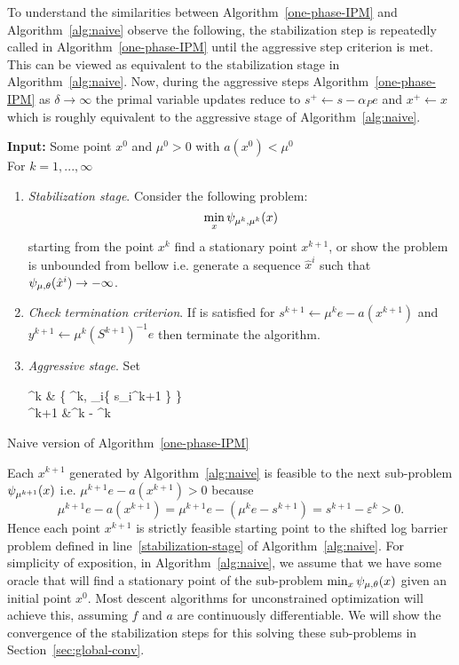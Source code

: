 \documentclass{article}
\begin{document}
To understand the similarities between Algorithm~\ref{one-phase-IPM} and Algorithm~\ref{alg:naive} observe the following, the stabilization step is repeatedly called in Algorithm~\ref{one-phase-IPM} until the aggressive step criterion is met. This can be viewed as equivalent to the stabilization stage in Algorithm~\ref{alg:naive}. Now, during the aggressive steps Algorithm~\ref{one-phase-IPM} as $\delta \rightarrow \infty$ the primal variable updates reduce to $s^{+} \gets s - \alpha_{P} e$ and $x^{+} \gets x$ which is roughly equivalent to the aggressive stage of Algorithm~\ref{alg:naive}. 

\begin{algorithm}[H]
\textbf{Input:} Some point $x^{0}$ and $\mu^{0} > 0$ with $a(x^{0}) < \mu^{0}$ \\

For $k = 1, ..., \infty$
\begin{enumerate}[label*=A.{\arabic*}]
\item \label{stabilization-stage} \emph{Stabilization stage}. Consider the following problem:
$$
\min_{x} \psi_{\mu^{k},\mu^{k}}(x)
$$
starting from the point $x^{k}$ find a stationary point $x^{k+1}$, or show the problem is unbounded from bellow i.e. generate a sequence $\hat{x}^{i}$ such that $\psi_{\mu,\theta}(\hat{x}^{i}) \rightarrow -\infty$.
\item \emph{Check termination criterion}. If \termination{} is satisfied for $s^{k+1} \gets \mu^{k} e - a(x^{k+1})$ and $y^{k+1} \gets \mu^{k} (S^{k+1})^{-1} e$ then terminate the algorithm.
\item \label{agg-stage} \emph{Aggressive stage}. Set
\begin{flalign}
\varepsilon^k &\gets {} \min\left\{ \mu^{k}, \min_i\{ s_i^{k+1} \} \right\} \\
\mu^{k+1} &\gets \mu^{k} - \varepsilon^k
\end{flalign}
\end{enumerate}
\caption{Naive version of Algorithm~\ref{one-phase-IPM}}\label{alg:naive}
\end{algorithm}

Each $x^{k+1}$ generated by Algorithm~\ref{alg:naive} is feasible to the next sub-problem $\psi_{\mu^{k+1}}(x)$ i.e. $\mu^{k+1} e - a(x^{k+1}) > 0$ because 
$$
\mu^{k+1} e - a(x^{k+1}) = \mu^{k+1} e - (\mu^{k} e - s^{k+1} )  = s^{k+1} - \varepsilon^{k} > 0.
$$
Hence each point $x^{k+1}$ is strictly feasible starting point to the shifted log barrier problem defined in line~\ref{stabilization-stage} of Algorithm~\ref{alg:naive}. For simplicity of exposition, in Algorithm~\ref{alg:naive}, we assume that we have some oracle that will find a stationary point of the sub-problem $\min_{x} \psi_{\mu,\theta}(x)$ given an initial point $x^{0}$. Most descent algorithms for unconstrained optimization will achieve this, assuming $f$ and $a$ are continuously differentiable. We will show the convergence of the stabilization steps for this solving these sub-problems in Section~\ref{sec:global-conv}. 
\end{document}
